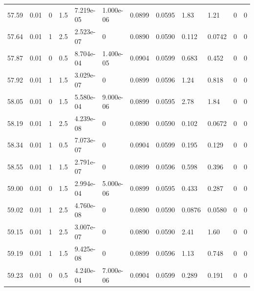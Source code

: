 \documentclass[preview]{standalone}
\begin{document}
{{{{{{{{{{{\begin{tabular}{L{1.2cm}C{1.2cm} C{0.3cm}C{0.5cm} C{1.4cm}C{1.4cm} C{1.4cm}C{1.4cm} C{1.6cm}C{1.6cm} C{1.6cm}C{1.6cm}}
  57.59  &  0.01  & 0     & 1.5 &  7.219e-05  & 1.000e-06  &  0.0899&   0.0595& 1.83 & 1.21   &  0 & 0  \\ 
  57.64  &  0.01  & 1     & 2.5 &  2.523e-07  & 0  &  0.0890&   0.0590& 0.112 & 0.0742   &  0 & 0  \\ 
  57.87  &  0.01  & 0     & 0.5 &  8.704e-04  & 1.400e-05  &  0.0904&   0.0599& 0.683 & 0.452   &  0 & 0  \\ 
  57.92  &  0.01  & 1     & 1.5 &  3.029e-07  & 0  &  0.0899&   0.0596& 1.24 & 0.818   &  0 & 0  \\ 
  58.05  &  0.01  & 0     & 1.5 &  5.580e-04  & 9.000e-06  &  0.0899&   0.0595& 2.78 & 1.84   &  0 & 0  \\ 
  58.19  &  0.01  & 1     & 2.5 &  4.239e-08  & 0  &  0.0890&   0.0590& 0.102 & 0.0672   &  0 & 0  \\ 
  58.34  &  0.01  & 1     & 0.5 &  7.073e-07  & 0  &  0.0904&   0.0599& 0.195 & 0.129   &  0 & 0  \\ 
  58.55  &  0.01  & 1     & 1.5 &  2.791e-07  & 0  &  0.0899&   0.0596& 0.598 & 0.396   &  0 & 0  \\ 
  59.00  &  0.01  & 0     & 1.5 &  2.994e-04  & 5.000e-06  &  0.0899&   0.0595& 0.433 & 0.287   &  0 & 0  \\ 
  59.02  &  0.01  & 1     & 2.5 &  4.760e-08  & 0  &  0.0890&   0.0590& 0.0876 & 0.0580   &  0 & 0  \\ 
  59.15  &  0.01  & 1     & 2.5 &  3.007e-07  & 0  &  0.0890&   0.0590& 2.41 & 1.60   &  0 & 0  \\ 
  59.19  &  0.01  & 1     & 1.5 &  9.425e-08  & 0  &  0.0899&   0.0596& 1.13 & 0.748   &  0 & 0  \\ 
  59.23  &  0.01  & 0     & 0.5 &  4.240e-04  & 7.000e-06  &  0.0904&   0.0599& 0.289 & 0.191   &  0 & 0  \\ 
\hline 
\end{tabular} 

}}}}}}}}}}}
\end{document}
